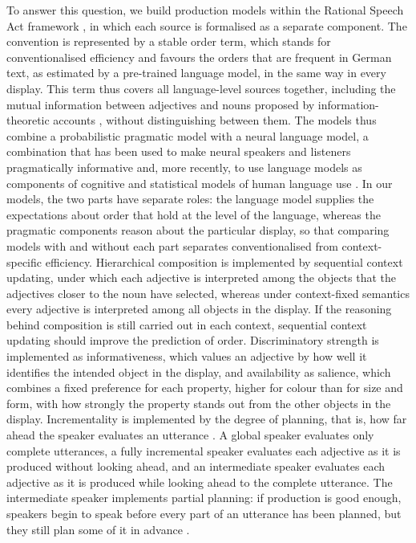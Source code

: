 \documentclass[10pt,a4paper,fleqn]{article}
\begin{document}
To answer this question, we build production models within the Rational Speech Act framework \citep{frank2012predicting,goodman2016pragmatic}, in which each source is formalised as a separate component.
The convention is represented by a stable order term, which stands for conventionalised efficiency and favours the orders that are frequent in German text, as estimated by a pre-trained language model, in the same way in every display.
This term thus covers all language-level sources together, including the mutual information between adjectives and nouns proposed by information-theoretic accounts \citep{Hahn_information_2018,futrell-etal-2020-determines}, without distinguishing between them.
The models thus combine a probabilistic pragmatic model with a neural language model, a combination that has been used to make neural speakers and listeners pragmatically informative \citep{andreas2016reasoning,10.1162/tacl_a_00064,cohn-gordon-etal-2018-pragmatically} and, more recently, to use language models as components of cognitive and statistical models of human language use \citep{futrell2023information,franke2024bayesian,tsvilodub2024cognitive}.
In our models, the two parts have separate roles: the language model supplies the expectations about order that hold at the level of the language, whereas the pragmatic components reason about the particular display, so that comparing models with and without each part separates conventionalised from context-specific efficiency.
Hierarchical composition is implemented by sequential context updating, under which each adjective is interpreted among the objects that the adjectives closer to the noun have selected, whereas under context-fixed semantics every adjective is interpreted among all objects in the display.
If the reasoning behind composition is still carried out in each context, sequential context updating should improve the prediction of order.
Discriminatory strength is implemented as informativeness, which values an adjective by how well it identifies the intended object in the display, and availability as salience, which combines a fixed preference for each property, higher for colour than for size and form, with how strongly the property stands out from the other objects in the display.
Incrementality is implemented by the degree of planning, that is, how far ahead the speaker evaluates an utterance \citep{cohngordon2019incremental,waldon2021modeling}.
A global speaker evaluates only complete utterances, a fully incremental speaker evaluates each adjective as it is produced without looking ahead, and an intermediate speaker evaluates each adjective as it is produced while looking ahead to the complete utterance.
The intermediate speaker implements partial planning: if production is good enough, speakers begin to speak before every part of an utterance has been planned, but they still plan some of it in advance \citep{ferreira2002incremental,ferreira2002goodenough}.
\end{document}
